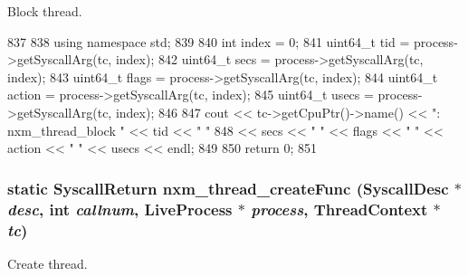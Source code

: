 Block thread. 


\begin{DoxyCode}
837     {
838         using namespace std;
839 
840         int index = 0;
841         uint64_t tid = process->getSyscallArg(tc, index);
842         uint64_t secs = process->getSyscallArg(tc, index);
843         uint64_t flags = process->getSyscallArg(tc, index);
844         uint64_t action = process->getSyscallArg(tc, index);
845         uint64_t usecs = process->getSyscallArg(tc, index);
846 
847         cout << tc->getCpuPtr()->name() << ": nxm_thread_block " << tid << " "
848              << secs << " " << flags << " " << action << " " << usecs << endl;
849 
850         return 0;
851     }
\end{DoxyCode}
\hypertarget{classTru64_a56167e2aed868ff95f0864b9075adab1}{
\subsubsection[{nxm\_\-thread\_\-createFunc}]{\setlength{\rightskip}{0pt plus 5cm}static {\bf SyscallReturn} nxm\_\-thread\_\-createFunc ({\bf SyscallDesc} $\ast$ {\em desc}, \/  int {\em callnum}, \/  {\bf LiveProcess} $\ast$ {\em process}, \/  {\bf ThreadContext} $\ast$ {\em tc})}}
\label{classTru64_a56167e2aed868ff95f0864b9075adab1}


Create thread. 


